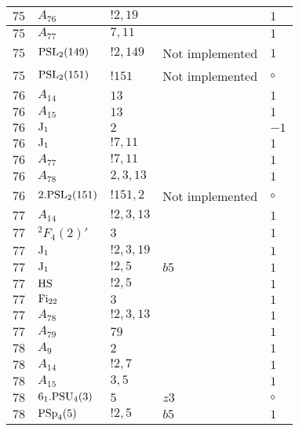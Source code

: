 \documentclass[a4paper, 11pt]{article}
\begin{document}
\begin{longtable}{lllll}
        $ 75 $ & $ A_{76} $ & $ !2, 19 $ & $ ~ $ & $ 1$ \\ \hline
        $ 75 $ & $ A_{77} $ & $ 7, 11 $ & $ ~ $ & $ 1$ \\ \hline
        $ 75 $ & $ {\rm PSL}_{2}(149) $ & $ !2, 149 $ &  Not implemented & $ 1$ \\ \hline
        $ 75 $ & $ {\rm PSL}_{2}(151) $ & $ !151 $ &  Not implemented &  $\circ$ \\ \hline
        $ 76 $ & $ A_{14} $ & $ 13 $ & $ ~ $ & $ 1$ \\ \hline
        $ 76 $ & $ A_{15} $ & $ 13 $ & $ ~ $ & $ 1$ \\ \hline
        $ 76 $ & $ {\rm J}_1 $ & $ 2 $ & $ ~ $ & $ -1$ \\ \hline
        $ 76 $ & $ {\rm J}_1 $ & $ ! 7,11 $ & $ ~ $ & $ 1$ \\ \hline
        $ 76 $ & $ A_{77} $ & $ !7, 11 $ & $ ~ $ & $ 1$ \\ \hline
        $ 76 $ & $ A_{78} $ & $ 2, 3, 13 $ & $ ~ $ & $ 1$ \\ \hline
        $ 76 $ & $ 2.{\rm PSL}_{2}(151) $ & $ !151, 2 $ &  Not implemented &  $\circ$ \\ \hline
        $ 77 $ & $ A_{14} $ & $ ! 2,3,13 $ & $ ~ $ & $ 1$ \\ \hline
        $ 77 $ & $ {}^{2}F_{4}(2)' $ & $ 3 $ & $ ~ $ & $ 1$ \\ \hline
        $ 77 $ & $ {\rm J}_1 $ & $ ! 2,3,19 $ & $ ~ $ & $ 1$ \\ \hline
        $ 77 $ & $ {\rm J}_1 $ & $ ! 2,5 $ & $ b5 $ & $ 1$ \\ \hline
        $ 77 $ & $ {\rm HS} $ & $ ! 2,5 $ & $ ~ $ & $ 1$ \\ \hline
        $ 77 $ & $ {\rm Fi}_{22} $ & $ 3 $ & $ ~ $ & $ 1$ \\ \hline
        $ 77 $ & $ A_{78} $ & $ !2, 3, 13 $ & $ ~ $ & $ 1$ \\ \hline
        $ 77 $ & $ A_{79} $ & $ 79 $ & $ ~ $ & $ 1$ \\ \hline
        $ 78 $ & $ A_{9} $ & $ 2 $ & $ ~ $ & $ 1$ \\ \hline
        $ 78 $ & $ A_{14} $ & $ ! 2,7 $ & $ ~ $ & $ 1$ \\ \hline
        $ 78 $ & $ A_{15} $ & $ 3,5 $ & $ ~ $ & $ 1$ \\ \hline
        $ 78 $ & $ 6_1.{\rm PSU}_{4}(3) $ & $ 5 $ & $ z3 $ &  $\circ$ \\ \hline
        $ 78 $ & $ {\rm PSp}_{4}(5) $ & $ ! 2,5 $ & $ b5 $ & $ 1$ \\ \hline

\end{longtable}
\end{document}
